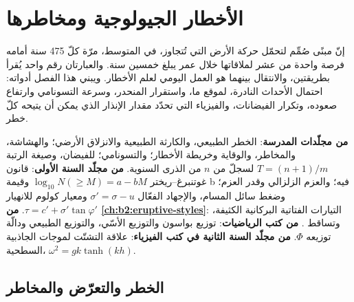 \chapter{الأخطار الجيولوجية ومخاطرها}\label{ch:b2:geological-hazards}

إنّ مبنًى صُمِّم لتحمّل حركة الأرض التي تُتجاوز، في المتوسط، مرّة كلّ 475 سنة أمامه
فرصة واحدة من عشر لملاقاتها خلال عمر يبلغ خمسين سنة. والعبارتان رقم واحد
يُقرأ بطريقتين، والانتقال بينهما هو العمل اليومي لعلم الأخطار. ويبني هذا الفصل
أدواته: احتمال الأحداث النادرة،  لموقع ما، واستقرار
المنحدر، وسرعة التسونامي وارتفاع صعوده، وتكرار الفيضانات، والفيزياء التي تحدّد
مقدار الإنذار الذي يمكن أن يتيحه كلّ خطر.

\begin{recall}
\textbf{من مجلّدات المدرسة}: الخطر الطبيعي، والكارثة الطبيعية والانزلاق الأرضي؛ والهشاشة،
والمخاطر، والوقاية وخريطة الأخطار؛ والتسونامي؛  للفيضان، وصيغة الرتبة
$T = (n + 1)/m$ لسجلّ من $n$ من الذرى السنوية. \textbf{من مجلّد السنة الأولى}: قانون
غوتنبرغ--ريختر $\log_{10} N(\geq M) = a - bM$ وقيمة b فيه؛ والعزم الزلزالي وقدر
العزم؛ وضغط سائل المسام، والإجهاد الفعّال $\sigma' = \sigma - u$ ومعيار كولوم
للانهيار $\tau = c' + \sigma' \tan\varphi'$. \textbf{من \cref{ch:b2:eruptive-styles}}: التيارات الفتاتية
البركانية الكثيفة،  وتساقط . \textbf{من كتب الرياضيات}: توزيع بواسون
والتوزيع الأسّي، والتوزيع الطبيعي ودالّة توزيعه $\Phi$.
\textbf{من مجلّد السنة الثانية في كتب الفيزياء}: علاقة التشتّت لموجات الجاذبية السطحية،
$\omega^2 = gk\tanh(kh)$.
\end{recall}

\section{الخطر والتعرّض والمخاطر}\label{sec:b2:geological-hazards:risk}

